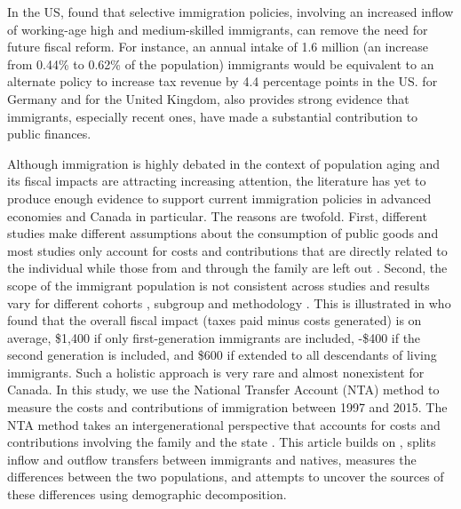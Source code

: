 \vspace{0.7em}\par
In the US, \citet{Storesletten:2000cn} found that selective immigration policies, involving an increased inflow of working-age high and medium-skilled immigrants, can remove the need for future fiscal reform.
For instance, an annual intake of 1.6 million (an increase from 0.44\% to 0.62\% of the population) immigrants would be equivalent to an alternate policy to increase tax revenue by 4.4 percentage points in the US.
\citet{Akin:2012gh} for Germany and \citet{Dustmann:2014dr} for the United Kingdom, also provides strong evidence that immigrants, especially recent ones, have made a substantial contribution to public finances.

\vspace{0.7em}\par
Although immigration is highly debated in the context of population aging and its fiscal impacts are attracting increasing attention, the literature has yet to produce enough evidence to support current immigration policies in advanced economies and Canada in particular.
The reasons are twofold.
First, different studies make different assumptions about the consumption of public goods \citep{Grubel:2012wo} and most studies only account for costs and contributions that are directly related to the individual while those from and through the family are left out \citep{dAlbis:2019de}.
Second, the scope of the immigrant population is not consistent across studies and results vary for different cohorts \citep{Grubel:2012wo}, subgroup and methodology \citep{Chojnicki:2011vu}.
This is illustrated in \citet{Lee:1998fs} who found that the overall fiscal impact (taxes paid minus costs generated) is on average, \$1,400 if only first-generation immigrants are included, -\$400 if the second generation is included, and  \$600 if extended to all descendants of living immigrants.
Such a holistic approach is very rare and almost nonexistent for Canada.
In this study, we use the National Transfer Account (NTA) method to measure the costs and contributions of immigration between 1997 and 2015.
The NTA method takes an intergenerational perspective that accounts for costs and contributions involving the family and the state \citep{Mason:2011wc,UnitedNations:2013vz}.
This article builds on \citet{Merette:2019kz}, splits inflow and outflow transfers between immigrants and natives, measures the differences between the two populations, and attempts to uncover the sources of these differences using demographic decomposition.

